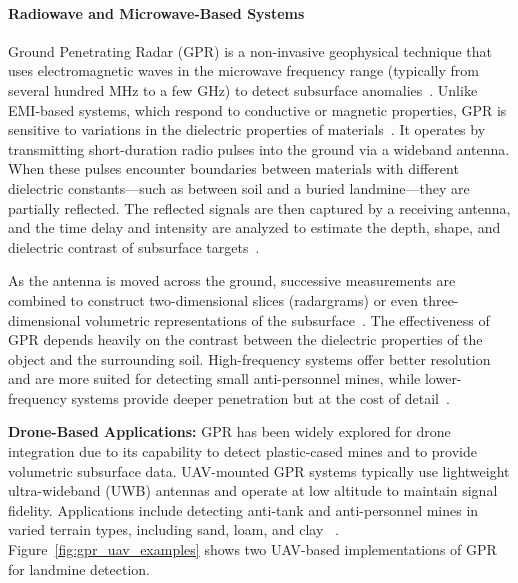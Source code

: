 
\paragraph{Radiowave and Microwave-Based Systems}

Ground Penetrating Radar (GPR) is a non-invasive geophysical technique that uses electromagnetic waves in the microwave frequency range (typically from several hundred MHz to a few GHz) to detect subsurface anomalies~\cite{gichd2006guidebook}. Unlike EMI-based systems, which respond to conductive or magnetic properties, GPR is sensitive to variations in the dielectric properties of materials~\cite{Gooneratne2004ARO}. It operates by transmitting short-duration radio pulses into the ground via a wideband antenna. When these pulses encounter boundaries between materials with different dielectric constants—such as between soil and a buried landmine—they are partially reflected. The reflected signals are then captured by a receiving antenna, and the time delay and intensity are analyzed to estimate the depth, shape, and dielectric contrast of subsurface targets~\cite{alqudsi2021review, paik2002image}.

As the antenna is moved across the ground, successive measurements are combined to construct two-dimensional slices (radargrams) or even three-dimensional volumetric representations of the subsurface~\cite{Bruschini1997ASO}. The effectiveness of GPR depends heavily on the contrast between the dielectric properties of the object and the surrounding soil. High-frequency systems offer better resolution and are more suited for detecting small anti-personnel mines, while lower-frequency systems provide deeper penetration but at the cost of detail~\cite{gichd2006guidebook}.


\textbf{Drone-Based Applications:} GPR has been widely explored for drone integration due to its capability to detect plastic-cased mines and to provide volumetric subsurface data. UAV-mounted GPR systems typically use lightweight ultra-wideband (UWB) antennas and operate at low altitude to maintain signal fidelity. Applications include detecting anti-tank and anti-personnel mines in varied terrain types, including sand, loam, and clay ~\cite{cerquera2017uav,vsipovs2020lightweight,colorado2017integrated,garcia2020airborne,garcia2019autonomous,burr2018design,fernandez2021development,lee2023modeling,sipos2017drone,garcia2022safedrone,schartel2018uav,chen2023ground}. Figure~\ref{fig:gpr_uav_examples} shows two UAV-based implementations of GPR for landmine detection.

